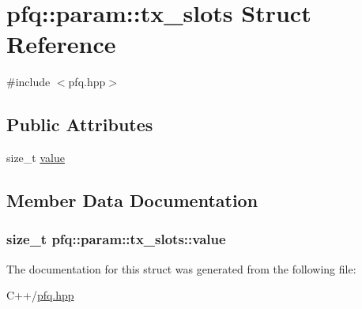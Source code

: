 \hypertarget{structpfq_1_1param_1_1tx__slots}{\section{pfq\+:\+:param\+:\+:tx\+\_\+slots Struct Reference}
\label{structpfq_1_1param_1_1tx__slots}
}


{\ttfamily \#include $<$pfq.\+hpp$>$}

\subsection*{Public Attributes}
\begin{DoxyCompactItemize}
\item 
size\+\_\+t \hyperlink{structpfq_1_1param_1_1tx__slots_a0211960e3e5bfab53d2ed6bb96445723}{value}
\end{DoxyCompactItemize}


\subsection{Member Data Documentation}
\hypertarget{structpfq_1_1param_1_1tx__slots_a0211960e3e5bfab53d2ed6bb96445723}{
\subsubsection[{value}]{\setlength{\rightskip}{0pt plus 5cm}size\+\_\+t pfq\+::param\+::tx\+\_\+slots\+::value}}\label{structpfq_1_1param_1_1tx__slots_a0211960e3e5bfab53d2ed6bb96445723}


The documentation for this struct was generated from the following file\+:\begin{DoxyCompactItemize}
\item 
C++/\hyperlink{pfq_8hpp}{pfq.\+hpp}\end{DoxyCompactItemize}
